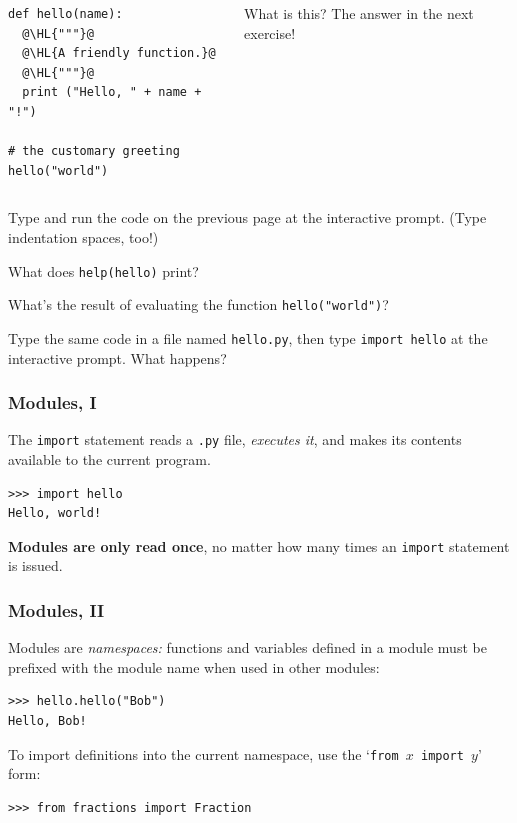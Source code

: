 \documentclass[english,serif,mathserif,xcolor=pdftex,dvipsnames,table]{beamer}
\begin{document}
\begin{frame}[fragile]
  \begin{columns}[t]
    \begin{column}{0.5\textwidth}
\begin{lstlisting}
def hello(name):
  @\HL{"""}@
  @\HL{A friendly function.}@
  @\HL{"""}@
  print ("Hello, " + name + "!")

# the customary greeting
hello("world")
\end{lstlisting}
    \end{column}
    \begin{column}{0.5\textwidth}
      \raggedleft
      What is this? The answer in the next exercise!
    \end{column}
  \end{columns}
\end{frame}

\begin{frame}
  \begin{exercise}
    Type and run the code on the previous page at the interactive
    prompt. (Type indentation spaces, too!)

    What does \texttt{help(hello)} print?

    What's the result of evaluating the function \texttt{hello("world")}?
  \end{exercise}

  \+
  \begin{exercise}
    Type the same code in a file named \texttt{hello.py}, then type
    \texttt{import hello} at the interactive prompt.
    What happens?
  \end{exercise}
\end{frame}


\begin{frame}[fragile]
  \frametitle{Modules, I}
  The \texttt{import} statement reads a \texttt{.py} file, \emph{executes
  it}, and makes its contents available to the current program.
\begin{lstlisting}
>>> import hello
Hello, world!
\end{lstlisting}

  \+
  \textbf{Modules are only read once}, no matter how many times an
  \texttt{import} statement is issued.
\end{frame}


\begin{frame}[fragile]
  \frametitle{Modules, II}
  Modules are \emph{namespaces:} functions and variables defined in
  a module must be prefixed with the module name when used in other
  modules:
\begin{lstlisting}
>>> hello.hello("Bob")
Hello, Bob!
\end{lstlisting}

  \+
  To import definitions into the current namespace, use the
  `\texttt{from $x$ import $y$}' form:
\begin{lstlisting}
>>> from fractions import Fraction
\end{lstlisting}
\end{frame}
\end{document}
